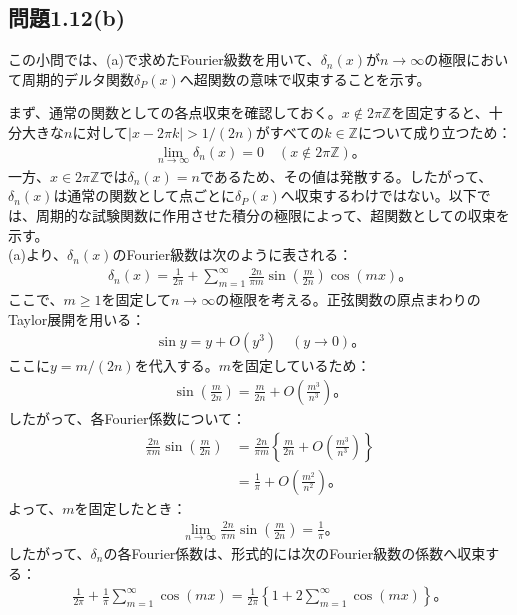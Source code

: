 \documentclass[platex,dvipdfmx,a4paper]{jsarticle}
\begin{document}
  \subsection*{問題1.12(b)}

  この小問では、(a)で求めたFourier級数を用いて、$\delta_n(x)$が$n\longrightarrow\infty$の極限において周期的デルタ関数$\delta_P(x)$へ超関数の意味で収束することを示す。
  
  まず、通常の関数としての各点収束を確認しておく。$x\notin2\pi\mathbb{Z}$を固定すると、十分大きな$n$に対して$|x-2\pi k|>1/(2n)$がすべての$k\in\mathbb{Z}$について成り立つため：
  \begin{align*}
    \lim_{n\to\infty}\delta_n(x)=0\quad(x\notin2\pi\mathbb{Z})。
  \end{align*}
  一方、$x\in2\pi\mathbb{Z}$では$\delta_n(x)=n$であるため、その値は発散する。したがって、$\delta_n(x)$は通常の関数として点ごとに$\delta_P(x)$へ収束するわけではない。以下では、周期的な試験関数に作用させた積分の極限によって、超関数としての収束を示す。\\
  (a)より、$\delta_n(x)$のFourier級数は次のように表される：
  \begin{align*}
    \delta_n(x)
    =\frac{1}{2\pi}
    +\sum_{m=1}^{\infty}\frac{2n}{\pi m}\sin\left(\frac{m}{2n}\right)\cos(mx)。
  \end{align*}
  ここで、$m\geq1$を固定して$n\longrightarrow\infty$の極限を考える。正弦関数の原点まわりのTaylor展開を用いる：
  \begin{align*}
    \sin y=y+O(y^3)\quad(y\longrightarrow0)。
  \end{align*}
  ここに$y=m/(2n)$を代入する。$m$を固定しているため：
  \begin{align*}
    \sin\left(\frac{m}{2n}\right)
    =\frac{m}{2n}+O\left(\frac{m^3}{n^3}\right)。
  \end{align*}
  したがって、各Fourier係数について：
  \begin{align*}
    \frac{2n}{\pi m}\sin\left(\frac{m}{2n}\right)
    &=\frac{2n}{\pi m}\left\{\frac{m}{2n}+O\left(\frac{m^3}{n^3}\right)\right\}\\
    &=\frac{1}{\pi}+O\left(\frac{m^2}{n^2}\right)。
  \end{align*}
  よって、$m$を固定したとき：
  \begin{align*}
    \lim_{n\to\infty}\frac{2n}{\pi m}\sin\left(\frac{m}{2n}\right)=\frac{1}{\pi}。
  \end{align*}
  したがって、$\delta_n$の各Fourier係数は、形式的には次のFourier級数の係数へ収束する：
  \begin{align*}
    \frac{1}{2\pi}+\frac{1}{\pi}\sum_{m=1}^{\infty}\cos(mx)
    =\frac{1}{2\pi}\left\{1+2\sum_{m=1}^{\infty}\cos(mx)\right\}。
  \end{align*}
\end{document}
